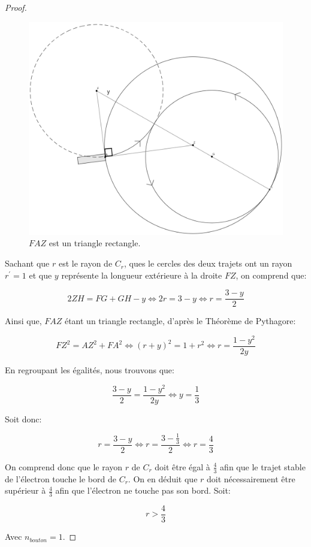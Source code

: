 \documentclass{amsart}
\theoremstyle{definition}
\theoremstyle{remark}
\numberwithin{equation}{section}
\begin{document}
\begin{proof}
  \begin{figure}[H]
    \centering
    \includegraphics[scale=0.15]{images/q2_representation.png}
    \caption{$FAZ$ est un triangle rectangle.}
  \end{figure}

  Sachant que $r$ est le rayon de $C_r$, ques le cercles des deux trajets ont un rayon $r^\prime=1$ et que $y$ représente la longueur extérieure à la droite $FZ$, on comprend que:

  \[2ZH=FG+GH-y \Leftrightarrow 2r=3-y \Leftrightarrow r=\frac{3-y}{2}\]

  Ainsi que, $FAZ$ étant un triangle rectangle, d'après le Théorème de Pythagore:

  \[FZ^2=AZ^2+FA^2 \Leftrightarrow (r+y)^2=1+r^2 \Leftrightarrow r=\frac{1-y^2}{2y}\]

  En regroupant les égalités, nous trouvons que:

  \[\frac{3-y}{2}=\frac{1-y^2}{2y}\Leftrightarrow y=\frac{1}{3}\]

  Soit donc:

  \[ r=\frac{3-y}{2}\Leftrightarrow r=\frac{3-\frac{1}{3}}{2} \Leftrightarrow r=\frac{4}{3}\]

  On comprend donc que le rayon $r$ de $C_r$ doit être égal à $\frac{4}{3}$ afin que le trajet stable de l'électron touche le bord de $C_r$. On en déduit que $r$ doit nécessairement être supérieur à $\frac{4}{3}$ afin que l'électron ne touche pas son bord.
  Soit:

  \[r>\frac{4}{3}\]

  Avec $n_{bouton}=1$.
\end{proof}
\end{document}

